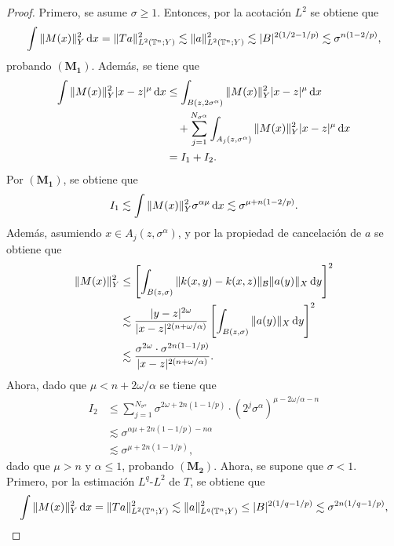 \begin{proof}
	Primero, se asume $\sigma \geq 1$. Entonces, por la acotación $L^2$ se obtiene que
	\begin{equation*}
		\int\|M(x)\|_Y^2\mathop{}\!\mathrm{d} x = \|Ta\|_{L^2(\mathbb{T}^n;Y)}^2 \lesssim \|a\|_{L^2(\mathbb{T}^n;Y)}^2 \lesssim |B|^{2(1/2-1/p)} \lesssim\sigma^{n(1-2/p)},
	\end{equation*}
	probando $(\mathbf{M_1})$. Además, se tiene que 
	\begin{align*}
		\int \|M(x)\|_Y^2|x-z|^\mu \mathop{}\!\mathrm{d} x  &\leq
		\int_{B(z, 2\sigma^\alpha)} \|M(x)\|_Y^2|x-z|^\mu \mathop{}\!\mathrm{d} x\\
		& \quad + \sum_{j=1}^{N_{\sigma^\alpha}} \int_{A_j(z, \sigma^\alpha)} \|M(x)\|_Y^2|x-z|^\mu \mathop{}\!\mathrm{d} x \\
		 &= I_1 + I_2.
	\end{align*}
	Por $(\mathbf{M_1})$, se obtiene que
	\begin{equation*}
		I_1 \lesssim\int\|M(x)\|_Y^2 \sigma^{\alpha\mu} \mathop{}\!\mathrm{d} x\lesssim  \sigma^{\mu +n(1-2/p)}.
	\end{equation*}
	Además, asumiendo $x\in A_j(z, \sigma^\alpha)$, y por la propiedad de cancelación de $a$ se obtiene que
	\begin{align*}
		\|M(x)\|_Y^2  &\leq  \left[ \int_{B(z, \sigma)} \|k(x, y) - k(x,z)\|_\mathcal{B} \|a(y)\|_X \mathop{}\!\mathrm{d} y \right]^2 \\
		 & \lesssim \frac{|y-z|^{2\omega}}{|x-z|^{2(n+\omega/\alpha)}} 
		\left[ \int_{B(z, \sigma)} \|a(y)\|_X \mathop{}\!\mathrm{d} y \right]^2 \\
		 & \lesssim \frac{\sigma^{2\omega} \cdot \sigma^{2n(1-1/p)}}{|x-z|^{2(n+\omega/\alpha)}}.
	\end{align*}
	Ahora, dado que $\mu < n + 2\omega/\alpha$ se tiene que
	\begin{align*}
		I_2  &\leq  \sum_{j=1}^{N_{\sigma^\alpha}} \sigma^{2\omega + 2n(1-1/p)} \cdot (2^j\sigma^\alpha)^{\mu - 2\omega/\alpha - n} \\
		 &  \lesssim \sigma^{\alpha\mu + 2n(1-1/p) - n\alpha} \\ 
		 & \lesssim \sigma^{\mu + 2n(1-1/p)},
	\end{align*}
	dado que $\mu > n$ y $\alpha \leq 1$, probando $(\mathbf{M_2})$. Ahora, se supone que $\sigma < 1$. Primero, por la estimación $L^q$-$L^2$ de $T$, se obtiene que 
	\begin{equation*}
		\int\|M(x)\|_Y^2\mathop{}\!\mathrm{d} x = \|Ta\|_{L^2(\mathbb{T}^n;Y)}^2 \lesssim \|a\|_{L^q(\mathbb{T}^n;Y)}^2 \leq |B|^{2(1/q-1/p)} \lesssim \sigma^{2n(1/q-1/p)},
	\end{equation*}

\end{proof}
